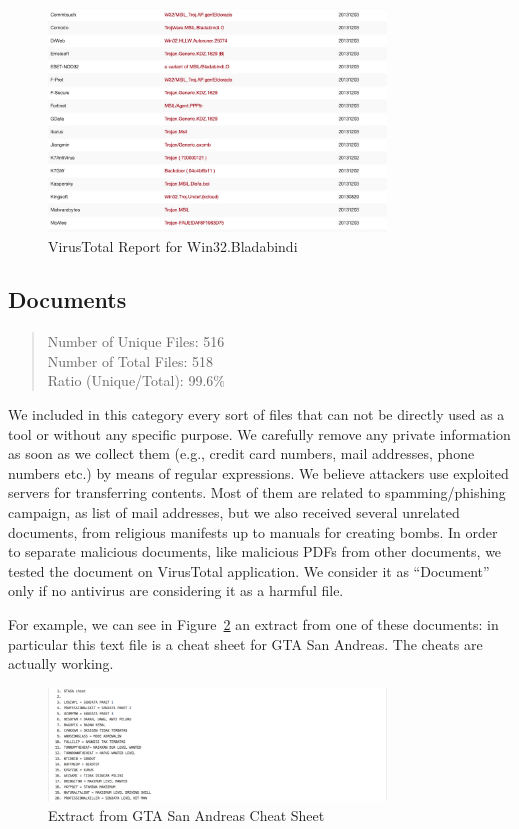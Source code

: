 \begin{figure}[H]
\centerline{\includegraphics[width=0.8\textwidth]{Images/malwareVT.jpg}}
\caption{VirusTotal Report for Win32.Bladabindi\label{fig:malware}}
\end{figure}

\subsection{Documents}

\begin{quote}
Number of Unique Files: 516\\
Number of Total Files: 518\\
Ratio (Unique/Total): 99.6\%
\end{quote}

We included in this category every sort of files that can not be directly used as a tool or without any specific purpose. We carefully remove any private information as soon as we collect them (e.g., credit card numbers, mail addresses, phone numbers etc.) by means of regular expressions. We believe attackers use exploited servers for transferring contents. Most of them are related to spamming/phishing campaign, as list of mail addresses, but we also received several unrelated documents, from religious manifests up to manuals for creating bombs. In order to separate malicious documents, like malicious PDFs from other documents, we tested the document on VirusTotal application. We consider it as ``Document'' only if no antivirus are considering it as a harmful file.

For example, we can see in Figure~\ref{fig:documentExample} an extract from one of these documents: in particular this text file is a cheat sheet for GTA San Andreas. The cheats are actually working.

\begin{figure}[H]
\centerline{\includegraphics[width=0.8\textwidth]{Images/documentExample.jpg}}
\caption{Extract from GTA San Andreas Cheat Sheet\label{fig:documentExample}}
\end{figure}

